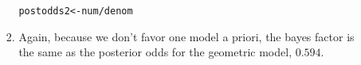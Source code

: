 \documentclass[12pt]{article}\usepackage[]{graphicx}\usepackage[]{color}
\makeatletter
\newcommand{\hlopt}[1]{\textcolor[rgb]{0,0,0}{#1}}%
\newcommand{\hlstd}[1]{\textcolor[rgb]{0.345,0.345,0.345}{#1}}%
\newcommand{\hlkwb}[1]{\textcolor[rgb]{0.69,0.353,0.396}{#1}}%
\newenvironment{kframe}{%
 \def\at@end@of@kframe{}%
 \ifinner\ifhmode%
  \def\at@end@of@kframe{\end{minipage}}%
  \begin{minipage}{\columnwidth}%
 \fi\fi%
 \def\FrameCommand##1{\hskip\@totalleftmargin \hskip-\fboxsep
 \colorbox{shadecolor}{##1}\hskip-\fboxsep
     \hskip-\linewidth \hskip-\@totalleftmargin \hskip\columnwidth}%
 \MakeFramed {\advance\hsize-\width
   \@totalleftmargin\z@ \linewidth\hsize
   \@setminipage}}%
 {\par\unskip\endMakeFramed%
 \at@end@of@kframe}
\newenvironment{knitrout}{}{} %
\makeatother
\begin{document}
\begin{doublespacing}
\begin{enumerate}
\begin{enumerate}
\begin{enumerate}
\begin{singlespace}
\begin{knitrout}
\begin{kframe}
\begin{alltt}
\hlstd{postodds2} \hlkwb{<-} \hlstd{num}\hlopt{/}\hlstd{denom}
\end{alltt}
\end{kframe}
\end{knitrout}
\end{singlespace}

\item Again, because we don't favor one model a priori, the bayes factor is the same as the posterior odds for the geometric model, $0.594$.

\end{enumerate}

\end{enumerate}

\end{enumerate}

\end{doublespacing}
\end{document}
